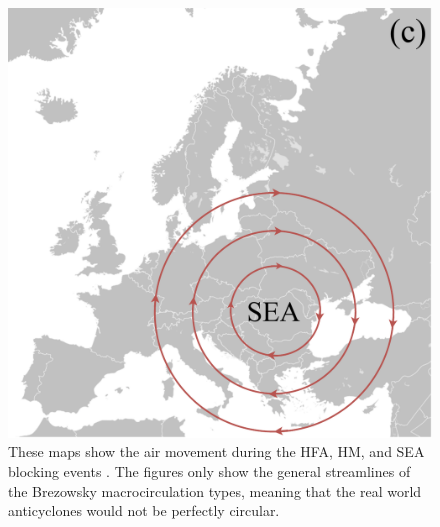 \begin{figure}[H]
\begin{minipage}{0.32\textwidth}
    \end{minipage}
    \hfill
    \begin{minipage}{0.32\textwidth}
        \includegraphics[width=\linewidth]{Figures/SEA.pdf}
    \end{minipage}
    \caption{These maps show the air movement during the HFA, HM, and SEA blocking events \cite{siglermarianBlankMapEurope2007}. The figures only show the general streamlines of the Brezowsky macrocirculation types, meaning that the real world anticyclones would not be perfectly circular.}
    \label{fig:map}
\end{figure}

\newpage
